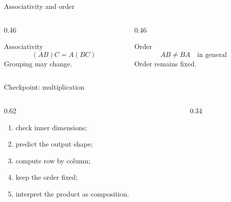 \begin{frame}{Associativity and order}
  \begin{columns}[T,onlytextwidth]
    \begin{column}{0.46\textwidth}
      \begin{exampleblock}{Associativity}
        \[
        (AB)C=A(BC)
        \]
        Grouping may change.
      \end{exampleblock}
    \end{column}
    \begin{column}{0.46\textwidth}
      \begin{alertblock}{Order}
        \[
        AB\neq BA\quad\text{in general}
        \]
        Order remains fixed.
      \end{alertblock}
    \end{column}
  \end{columns}
\end{frame}

\begin{frame}{Checkpoint: multiplication}
  \begin{columns}[T,onlytextwidth]
    \begin{column}{0.62\textwidth}
      \Large
      \begin{enumerate}
        \item check inner dimensions;
        \item predict the output shape;
        \item compute row by column;
        \item keep the order fixed;
        \item interpret the product as composition.
      \end{enumerate}
    \end{column}
    \begin{column}{0.34\textwidth}
    \end{column}
  \end{columns}
\end{frame}

